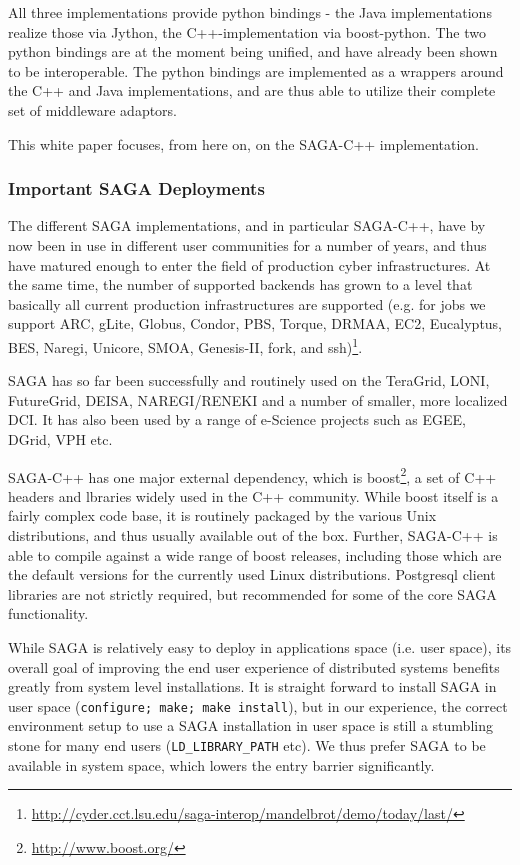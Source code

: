 \documentclass[12pt]{article}
\newcommand{\T}[1]{\texttt{#1}}
\begin{document}
   All three implementations provide python bindings - the Java
   implementations realize those via Jython, the C++-implementation
   via boost-python.  The two python bindings are at the moment being
   unified, and have already been shown to be interoperable.  The
   python bindings are implemented as a wrappers around the C++ and
   Java implementations, and are thus able to utilize their complete
   set of middleware adaptors.

   This white paper focuses, from here on, on the SAGA-C++
   implementation.


  \subsubsection{Important SAGA Deployments}

   The different SAGA implementations, and in particular SAGA-C++,
   have by now been in use in different user communities for a number
   of years, and thus have matured enough to enter the field of
   production cyber infrastructures.  At the same time, the number of
   supported backends has grown to a level that basically all current
   production infrastructures are supported (e.g. for jobs we support
   ARC, gLite, Globus, Condor, PBS, Torque, DRMAA, EC2, Eucalyptus,
   BES, Naregi, Unicore, SMOA, Genesis-II, fork, and
   ssh)\footnote{\url{http://cyder.cct.lsu.edu/saga-interop/mandelbrot/demo/today/last/}}.

   SAGA has so far been successfully and routinely used on the
   TeraGrid, LONI, FutureGrid, DEISA, NAREGI/RENEKI and a number of
   smaller, more localized DCI. It has also been used by a range of
   e-Science projects such as EGEE, DGrid, VPH etc.

   SAGA-C++ has one major external dependency, which is
   boost\footnote{\url{http://www.boost.org/}}, a set of C++ headers
   and lbraries widely used in the C++ community.  While boost itself
   is a fairly complex code base, it is routinely packaged by the
   various Unix distributions, and thus usually available out of the
   box.  Further, SAGA-C++ is able to compile against a wide range of
   boost releases, including those which are the default versions for
   the currently used Linux distributions.  Postgresql client
   libraries are not strictly required, but recommended for some of
   the core SAGA functionality.

   While SAGA is relatively easy to deploy in applications space (i.e.
   user space), its overall goal of improving the end user experience
   of distributed systems benefits greatly from system level
   installations.  It is straight forward to install SAGA in user
   space (\T{configure; make; make install}), but in our experience,
   the correct environment setup to use a SAGA installation in user
   space is still a stumbling stone for many end users
   (\T{LD\_LIBRARY\_PATH} etc).  We thus prefer SAGA to be available
   in system space, which lowers the entry barrier significantly.  
\end{document}
